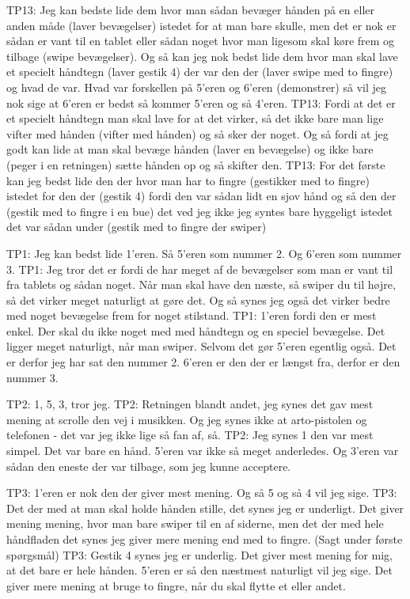  
TP13: Jeg kan bedste lide dem hvor man sådan bevæger hånden på en eller anden måde (laver bevægelser) istedet for at man bare skulle, men det er nok er sådan er vant til en tablet eller sådan noget hvor man ligesom skal køre frem og tilbage (swipe bevægelser). Og så kan jeg nok bedst lide dem hvor man skal lave et specielt håndtegn (laver gestik 4) der var den der (laver swipe med to fingre) og hvad de var. Hvad var forskellen på 5’eren og 6’eren (demonstrer) så vil jeg nok sige at 6’eren er bedst så kommer 5’eren og så 4’eren.
TP13: Fordi at det er et specielt håndtegn man skal lave for at det virker, så det ikke bare man lige vifter med hånden (vifter med hånden) og så sker der noget. Og så fordi at jeg godt kan lide at man skal bevæge hånden (laver en bevægelse) og ikke bare (peger i en retningen) sætte hånden op og så skifter den. 
TP13: For det første kan jeg bedst lide den der hvor man har to fingre (gestikker med to fingre) istedet for den der (gestik 4) fordi den var sådan lidt en sjov hånd og så den der (gestik med to fingre i en bue) det ved jeg ikke jeg syntes bare hyggeligt istedet det var sådan under (gestik med to fingre der swiper)





TP1: Jeg kan bedst lide 1’eren. Så 5’eren som nummer 2. Og 6’eren som nummer 3. 
TP1: Jeg tror det er fordi de har meget af de bevægelser som man er vant til fra tablets og sådan noget. Når man skal have den næste, så swiper du til højre, så det virker meget naturligt at gøre det. Og så synes jeg også det virker bedre med noget bevægelse frem for noget stilstand.
TP1: 1’eren fordi den er mest enkel. Der skal du ikke noget med med håndtegn og en speciel bevægelse. Det ligger meget naturligt, når man swiper. Selvom det gør 5’eren egentlig også. Det er derfor jeg har sat den nummer 2. 6’eren er den der er længst fra, derfor er den nummer 3. 


TP2: 1, 5, 3, tror jeg. 
TP2: Retningen blandt andet, jeg synes det gav mest mening at scrolle den vej i musikken. Og jeg synes ikke at arto-pistolen og telefonen - det var jeg ikke lige så fan af, så.
TP2: Jeg synes 1 den var mest simpel. Det var bare en hånd. 5’eren var ikke så meget anderledes. Og 3’eren var sådan den eneste der var tilbage, som jeg kunne acceptere. 

TP3: 1’eren er nok den der giver mest mening. Og så 5 og så 4 vil jeg sige.
TP3: Det der med at man skal holde hånden stille, det synes jeg er underligt. Det giver mening mening, hvor man bare swiper til en af siderne, men det der med hele håndfladen det synes jeg giver mere mening end med to fingre. (Sagt under første spørgsmål)
TP3: Gestik 4 synes jeg er underlig. Det giver mest mening for mig, at det bare er hele hånden. 5’eren er så den næstmest naturligt vil jeg sige. Det giver mere mening at bruge to fingre, når du skal flytte et eller andet. 


